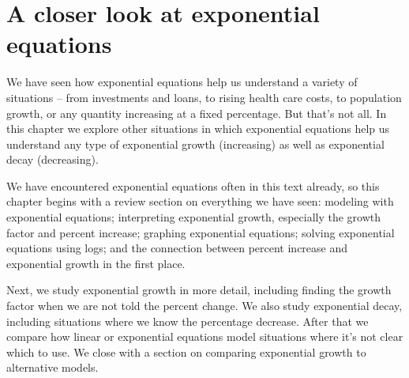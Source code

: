 

\chapter{A closer look at exponential equations}

We have seen how exponential equations help us understand a variety of situations -- from investments and loans, to rising health care costs, to population growth, or any quantity increasing at a fixed percentage.  But that's not all.  In this chapter we explore other situations in which exponential equations help us understand any type of exponential growth (increasing) as well as exponential decay (decreasing).  

We have encountered exponential equations often in this text already, so this chapter begins with a review section on everything we have seen:  modeling with exponential equations; interpreting exponential growth, especially the growth factor and percent increase; graphing exponential equations; solving exponential equations using logs; and the connection between percent increase and exponential growth in the first place.

Next, we study exponential growth in more detail, including finding the growth factor when we are not told the percent change.  We also study exponential decay, including situations where we know the percentage decrease.  After that we compare how linear or exponential equations model situations where it's not clear which to use.  We close with a section on comparing exponential growth to alternative models.
